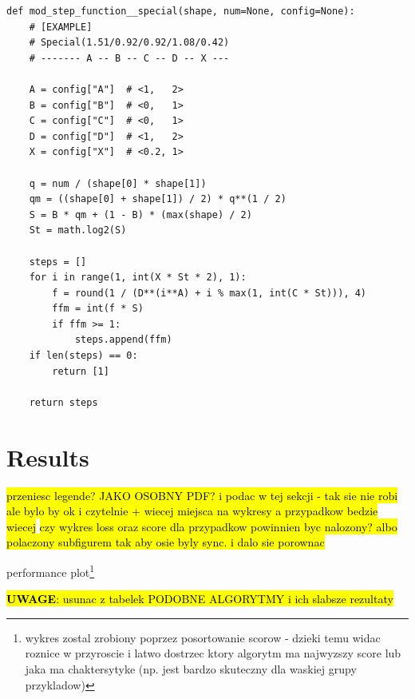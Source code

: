 \documentclass[format=acmsmall,screen,review,authordraft,nonacm]{acmart}
\begin{document}
\begin{lstlisting}
def mod_step_function__special(shape, num=None, config=None):
    # [EXAMPLE]
    # Special(1.51/0.92/0.92/1.08/0.42)
    # ------- A -- B -- C -- D -- X --- 

    A = config["A"]  # <1,   2>
    B = config["B"]  # <0,   1>
    C = config["C"]  # <0,   1>
    D = config["D"]  # <1,   2>
    X = config["X"]  # <0.2, 1>

    q = num / (shape[0] * shape[1])
    qm = ((shape[0] + shape[1]) / 2) * q**(1 / 2)
    S = B * qm + (1 - B) * (max(shape) / 2)
    St = math.log2(S)

    steps = []
    for i in range(1, int(X * St * 2), 1):
        f = round(1 / (D**(i**A) + i % max(1, int(C * St))), 4)
        ffm = int(f * S)
        if ffm >= 1:
            steps.append(ffm)
    if len(steps) == 0:
        return [1]

    return steps
\end{lstlisting}

\section{Results} %
\pagecolor{yellow}

\hl {przeniesc legende? JAKO OSOBNY PDF? i podac w tej sekcji - tak sie nie robi
ale bylo by ok i czytelnie + wiecej miejsca na wykresy a przypadkow bedzie
wiecej}
\hl{czy wykres loss oraz score dla przypadkow powinnien byc nalozony? albo
polaczony subfigurem tak aby osie byly sync. i dalo sie porownac}

performance plot\footnote{wykres zostal zrobiony poprzez posortowanie scorow - dzieki temu widac roznice w
przyroscie i latwo dostrzec ktory algorytm ma najwyzszy score lub jaka ma
chaktersytyke (np. jest bardzo skuteczny dla waskiej grupy przykladow)
}

\hl{\textbf{UWAGE}: usunac z tabelek PODOBNE ALGORYTMY i ich slabsze rezultaty}

\end{document}
